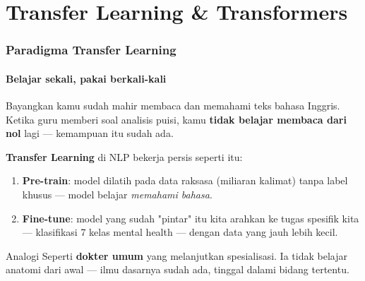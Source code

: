 \documentclass[t,aspectratio=169,xcolor=dvipsnames]{beamer}
\begin{document}
\section{Transfer Learning \& Transformers}

\begin{frame}
    \frametitle{Paradigma Transfer Learning}
    \framesubtitle{Belajar sekali, pakai berkali-kali}
    \small
    Bayangkan kamu sudah mahir membaca dan memahami teks bahasa Inggris.
    Ketika guru memberi soal analisis puisi, kamu \textbf{tidak belajar membaca dari nol} lagi — kemampuan itu sudah ada.

    \vspace{0.4em}
    \textbf{Transfer Learning} di NLP bekerja persis seperti itu:

    \vspace{0.2em}
    \begin{enumerate}
        \item \textbf{Pre-train}: model dilatih pada data raksasa (miliaran kalimat) tanpa label khusus — model belajar \textit{memahami bahasa}.
        \item \textbf{Fine-tune}: model yang sudah "pintar" itu kita arahkan ke tugas spesifik kita — klasifikasi 7 kelas mental health — dengan data yang jauh lebih kecil.
    \end{enumerate}

    \vspace{0.3em}
    \begin{exampleblock}{Analogi}
        \footnotesize
        Seperti \textbf{dokter umum} yang melanjutkan spesialisasi. Ia tidak belajar anatomi dari awal — ilmu dasarnya sudah ada, tinggal dalami bidang tertentu.
    \end{exampleblock}
\end{frame}
\end{document}
